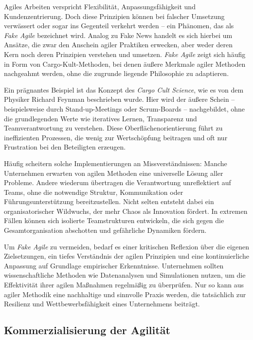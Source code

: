 \documentclass[ngerman]{seminarvorlage}
\begin{document}
Agiles Arbeiten verspricht Flexibilität, Anpassungsfähigkeit und Kundenzentrierung. Doch diese Prinzipien können bei falscher Umsetzung verwässert oder sogar ins Gegenteil verkehrt werden – ein Phänomen, das als \textit{Fake Agile} bezeichnet wird. Analog zu \glqq Fake News\grqq{} handelt es sich hierbei um Ansätze, die zwar den Anschein agiler Praktiken erwecken, aber weder deren Kern noch deren Prinzipien verstehen und umsetzen. \textit{Fake Agile} zeigt sich häufig in Form von Cargo-Kult-Methoden, bei denen äußere Merkmale agiler Methoden nachgeahmt werden, ohne die zugrunde liegende Philosophie zu adaptieren.

Ein prägnantes Beispiel ist das Konzept des \textit{Cargo Cult Science}, wie es von dem Physiker Richard Feynman beschrieben wurde. Hier wird der äußere Schein – beispielsweise durch Stand-up-Meetings oder Scrum-Boards – nachgebildet, ohne die grundlegenden Werte wie iteratives Lernen, Transparenz und Teamverantwortung zu verstehen. Diese Oberflächenorientierung führt zu ineffizienten Prozessen, die wenig zur Wertschöpfung beitragen und oft nur Frustration bei den Beteiligten erzeugen.

Häufig scheitern solche Implementierungen an Missverständnissen: Manche Unternehmen erwarten von agilen Methoden eine universelle Lösung aller Probleme. Andere wiederum übertragen die Verantwortung unreflektiert auf Teams, ohne die notwendige Struktur, Kommunikation oder Führungsunterstützung bereitzustellen. Nicht selten entsteht dabei ein organisatorischer Wildwuchs, der mehr Chaos als Innovation fördert. In extremen Fällen können sich isolierte Teamstrukturen entwickeln, die sich gegen die Gesamtorganisation abschotten und gefährliche Dynamiken fördern.

Um \textit{Fake Agile} zu vermeiden, bedarf es einer kritischen Reflexion über die eigenen Zielsetzungen, ein tiefes Verständnis der agilen Prinzipien und eine kontinuierliche Anpassung auf Grundlage empirischer Erkenntnisse. Unternehmen sollten wissenschaftliche Methoden wie Datenanalysen und Simulationen nutzen, um die Effektivität ihrer agilen Maßnahmen regelmäßig zu überprüfen. Nur so kann aus agiler Methodik eine nachhaltige und sinnvolle Praxis werden, die tatsächlich zur Resilienz und Wettbewerbsfähigkeit eines Unternehmens beiträgt.
\cite{Mucke.2024}

\subsection{Kommerzialisierung der Agilität}
\end{document}
